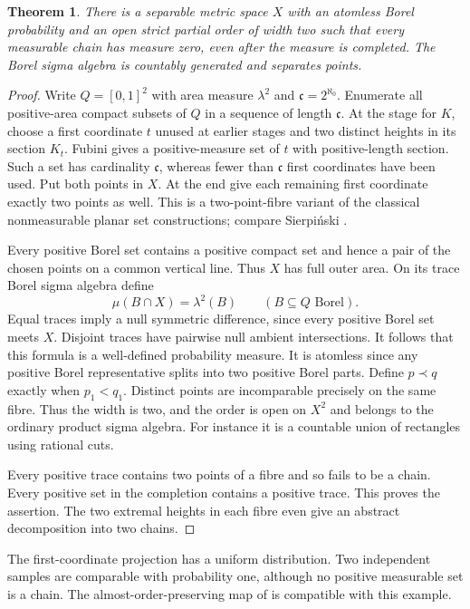 \documentclass[11pt]{article}
\newtheorem{theorem}{Theorem}
\begin{document}
\begin{theorem}\label{negative}
There is a separable metric space $X$ with an atomless Borel probability and an open strict partial order of width two such that every measurable chain has measure zero, even after the measure is completed. The Borel sigma algebra is countably generated and separates points.
\end{theorem}
\begin{proof}
Write $Q=[0,1]^2$ with area measure $\lambda^2$ and $\mathfrak c=2^{\aleph_0}$. Enumerate all positive-area compact subsets of $Q$ in a sequence of length $\mathfrak c$. At the stage for $K$, choose a first coordinate $t$ unused at earlier stages and two distinct heights in its section $K_t$. Fubini gives a positive-measure set of $t$ with positive-length section. Such a set has cardinality $\mathfrak c$, whereas fewer than $\mathfrak c$ first coordinates have been used. Put both points in $X$. At the end give each remaining first coordinate exactly two points as well. This is a two-point-fibre variant of the classical nonmeasurable planar set constructions; compare Sierpi\'nski \cite{sier}.

Every positive Borel set contains a positive compact set and hence a pair of the chosen points on a common vertical line. Thus $X$ has full outer area. On its trace Borel sigma algebra define
\[
              \mu(B\cap X)=\lambda^2(B)\qquad (B\subseteq Q\text{ Borel}).
\]
Equal traces imply a null symmetric difference, since every positive Borel set meets $X$. Disjoint traces have pairwise null ambient intersections. It follows that this formula is a well-defined probability measure. It is atomless since any positive Borel representative splits into two positive Borel parts. Define $p\prec q$ exactly when $p_1<q_1$. Distinct points are incomparable precisely on the same fibre. Thus the width is two, and the order is open on $X^2$ and belongs to the ordinary product sigma algebra. For instance it is a countable union of rectangles using rational cuts.

Every positive trace contains two points of a fibre and so fails to be a chain. Every positive set in the completion contains a positive trace. This proves the assertion. The two extremal heights in each fibre even give an abstract decomposition into two chains.
\end{proof}
The first-coordinate projection has a uniform distribution. Two independent samples are comparable with probability one, although no positive measurable set is a chain. The almost-order-preserving map of \cite[Theorem 1.10]{ordered} is compatible with this example.
\end{document}
